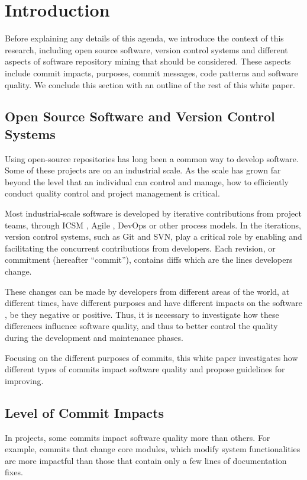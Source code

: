\section{Introduction}
\label{sec:introduction}

Before explaining any details of this agenda, we introduce the context of this research, including open source software, version control systems and different aspects of software repository mining that should be considered. 
These aspects include commit impacts, purposes, commit messages, code patterns and software quality.
We conclude this section with an outline of the rest of this white paper. 

\subsection{Open Source Software and Version Control Systems}
Using open-source repositories has long been a common way to develop software.
Some of these projects are on an industrial scale.
As the scale has grown far beyond the level that an individual can control and manage, how to efficiently conduct quality control and project management is critical.

Most industrial-scale software is developed by iterative contributions from project teams, through ICSM \cite{icsm2014}, Agile \cite{agile2004}, DevOps \cite{devops2016} or other process models. 
In the iterations, version control systems, such as Git and SVN, play a critical role by enabling and facilitating the concurrent contributions from developers.
Each revision, or commitment (hereafter ``commit''), contains diffs which are the lines developers change.


These changes can be made by developers from different areas of the world, at different times, have different purposes and have different impacts on the software \cite{qrs2020}, be they negative or positive. 
Thus, it is necessary to investigate how these differences influence software quality, and thus to better control the quality during the development and maintenance phases. 

Focusing on the different purposes of commits, this white paper investigates how different types of commits impact software quality and propose guidelines for improving. 


\subsection{Level of Commit Impacts}
In projects, some commits impact software quality more than others.
For example, commits that change core modules, which modify system functionalities are more impactful than those that contain only a few lines of documentation fixes.


